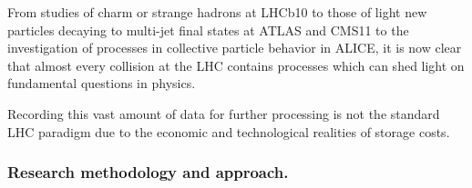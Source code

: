 


From studies of charm or strange hadrons at LHCb10 to those of light new particles decaying to multi-jet final states at ATLAS and CMS11 to the investigation of processes in collective particle behavior in ALICE, it is now clear that almost every collision at the LHC contains processes which can shed light on fundamental questions in physics. 

Recording this vast amount of data for further processing is not the standard LHC paradigm due to the economic and technological realities of storage costs. 



\subsubsection{Research methodology and approach.}
\label{sec:metho}

